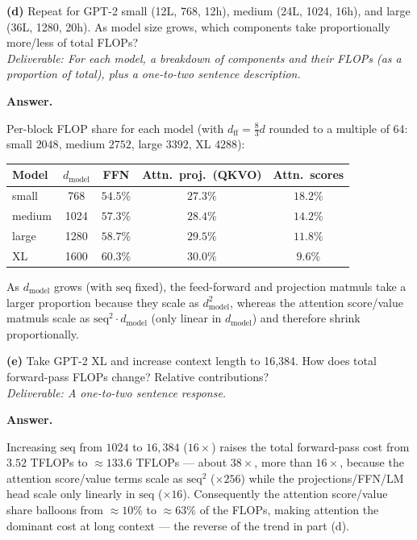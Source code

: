 \documentclass[11pt]{article}
\newenvironment{answer}%
  {\par\noindent\textbf{Answer.}\par\vspace{0.25em}\begingroup\color{black!85}}%
  {\endgroup\par\vspace{1em}}
\begin{document}
\textbf{(d)} Repeat for GPT-2 small (12L, 768, 12h), medium (24L, 1024, 16h), and large (36L, 1280, 20h). As model size grows, which components take proportionally more/less of total FLOPs? \\
\emph{Deliverable: For each model, a breakdown of components and their FLOPs (as a proportion of total), plus a one-to-two sentence description.}
\begin{answer}
Per-block FLOP share for each model (with $d_{\text{ff}} = \tfrac{8}{3}d$ rounded to a multiple of 64: small $2048$, medium $2752$, large $3392$, XL $4288$):

\begin{center}
\begin{tabular}{lcccc}
\toprule
Model & $d_{\text{model}}$ & FFN & Attn.\ proj.\ (QKVO) & Attn.\ scores \\
\midrule
small  & 768  & $54.5\%$ & $27.3\%$ & $18.2\%$ \\
medium & 1024 & $57.3\%$ & $28.4\%$ & $14.2\%$ \\
large  & 1280 & $58.7\%$ & $29.5\%$ & $11.8\%$ \\
XL     & 1600 & $60.3\%$ & $30.0\%$ & $9.6\%$  \\
\bottomrule
\end{tabular}
\end{center}

As $d_{\text{model}}$ grows (with $\text{seq}$ fixed), the feed-forward and projection matmuls take a larger proportion because they scale as $d_{\text{model}}^2$, whereas the attention score/value matmuls scale as $\text{seq}^2 \cdot d_{\text{model}}$ (only linear in $d_{\text{model}}$) and therefore shrink proportionally.
\end{answer}

\textbf{(e)} Take GPT-2 XL and increase context length to 16{,}384. How does total forward-pass FLOPs change? Relative contributions? \\
\emph{Deliverable: A one-to-two sentence response.}
\begin{answer}
Increasing $\text{seq}$ from $1024$ to $16{,}384$ ($16\times$) raises the total forward-pass cost from $3.52$ TFLOPs to $\approx 133.6$ TFLOPs --- about $38\times$, more than $16\times$, because the attention score/value terms scale as $\text{seq}^2$ ($\times 256$) while the projections/FFN/LM head scale only linearly in $\text{seq}$ ($\times 16$). Consequently the attention score/value share balloons from $\approx 10\%$ to $\approx 63\%$ of the FLOPs, making attention the dominant cost at long context --- the reverse of the trend in part (d).
\end{answer}
\end{document}
